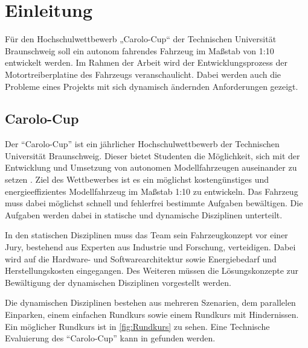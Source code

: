 \chapter{Einleitung}

Für den Hochschulwettbewerb „Carolo-Cup“ der Technischen Universität Braunschweig soll ein autonom fahrendes Fahrzeug im Maßstab von 1:10
entwickelt werden. Im Rahmen der Arbeit wird der Entwicklungsprozess der Motortreiberplatine des Fahrzeugs veranschaulicht.
Dabei werden auch die Probleme eines Projekts mit sich dynamisch ändernden Anforderungen gezeigt. 


\section{Carolo-Cup}
Der ``Carolo-Cup'' ist ein jährlicher Hochschulwettbewerb der Technischen Universität Braunschweig. Dieser bietet Studenten die Möglichkeit, sich mit der Entwicklung 
und Umsetzung von autonomen Modellfahrzeugen auseinander zu setzen \cite{website-carolo-cup}. Ziel des Wettbewerbes ist es ein möglichst kostengünstiges
und energieeffizientes Modellfahrzeug im Maßstab 1:10 zu entwickeln. Das Fahrzeug muss dabei möglichst schnell und fehlerfrei bestimmte Aufgaben
bewältigen. Die Aufgaben werden dabei in statische und dynamische Disziplinen unterteilt. 

In den statischen Disziplinen muss das Team sein Fahrzeugkonzept vor einer Jury, bestehend aus Experten aus Industrie und Forschung, verteidigen.
Dabei wird auf die Hardware- und Softwarearchitektur sowie Energiebedarf und Herstellungskosten eingegangen. Des Weiteren müssen die Lösungskonzepte
zur Bewältigung der dynamischen Disziplinen vorgestellt werden.

Die dynamischen Disziplinen bestehen aus mehreren Szenarien, dem parallelen Einparken, einem einfachen Rundkurs sowie einem Rundkurs mit Hindernissen.
Ein möglicher Rundkurs ist in \cref{fig:Rundkurs} zu sehen.
Eine Technische Evaluierung des ``Carolo-Cup'' kann in \cite{Zug1410:Technica} gefunden werden.

